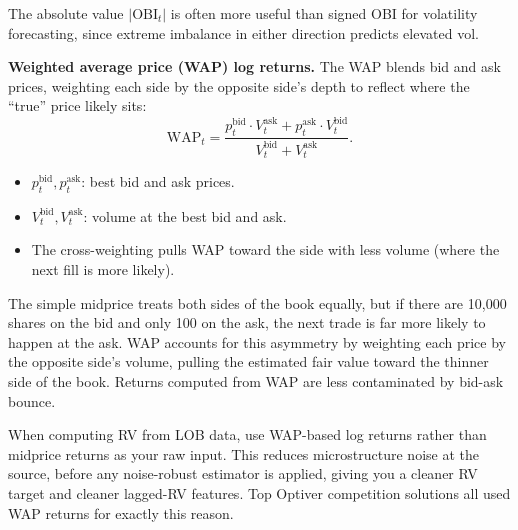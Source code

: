 \begin{projectconnection}
The absolute value $|\text{OBI}_t|$ is often more useful than signed OBI for volatility forecasting, since extreme imbalance in either direction predicts elevated vol.
\end{projectconnection}

\textbf{Weighted average price (WAP) log returns.}
The WAP blends bid and ask prices, weighting each side by the opposite side's depth to reflect where the ``true'' price likely sits:
\begin{equation}\label{eq:wap}
\text{WAP}_t = \frac{p_t^{\text{bid}} \cdot V_t^{\text{ask}} + p_t^{\text{ask}} \cdot V_t^{\text{bid}}}{V_t^{\text{bid}} + V_t^{\text{ask}}}.
\end{equation}
\begin{itemize}[nosep]
  \item $p_t^{\text{bid}}, p_t^{\text{ask}}$: best bid and ask prices.
  \item $V_t^{\text{bid}}, V_t^{\text{ask}}$: volume at the best bid and ask.
  \item The cross-weighting pulls WAP toward the side with less volume (where the next fill is more likely).
\end{itemize}

\begin{intuition}
The simple midprice treats both sides of the book equally, but if there are 10,000 shares on the bid and only 100 on the ask, the next trade is far more likely to happen at the ask. WAP accounts for this asymmetry by weighting each price by the opposite side's volume, pulling the estimated fair value toward the thinner side of the book. Returns computed from WAP are less contaminated by bid-ask bounce.
\end{intuition}

\begin{projectconnection}
When computing RV from LOB data, use WAP-based log returns rather than midprice returns as your raw input. This reduces microstructure noise at the source, before any noise-robust estimator is applied, giving you a cleaner RV target and cleaner lagged-RV features. Top Optiver competition solutions all used WAP returns for exactly this reason.
\end{projectconnection}

